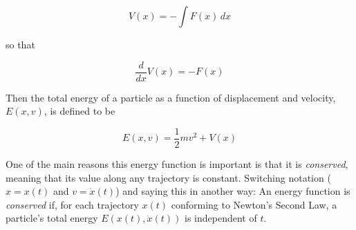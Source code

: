 \documentclass{article}
\theoremstyle{definition}
\begin{document}
\begin{equation}
V(x) = - \int F(x) \, dx
\label{eqn:V(x)}
\end{equation}

\noindent
so that 

\begin{equation}
\dfrac{d}{dx}V(x) = -F(x)
\label{eqn:F}
\end{equation}

\bigskip
\noindent
Then the total energy of a particle as a function of displacement 
and velocity, $E(x,v)$, is defined to be 

\begin{equation}
E(x,v) = \dfrac{1}{2}mv^{2} + V(x)
\label{eqn:E}
\end{equation}

\medskip
\noindent
One of the main reasons this energy function is important is that it is 
\emph{conserved}, meaning that its value along any trajectory is constant.
Switching notation ($x = x(t)$ and $v = \dot{x}(t)$) and saying this in 
another way: An energy function is \emph{conserved} if, for each trajectory 
$x(t)$ conforming to Newton’s Second Law, a particle's total energy 
$E(x(t),\dot{x}(t))$ is independent of $t$.
\end{document}
